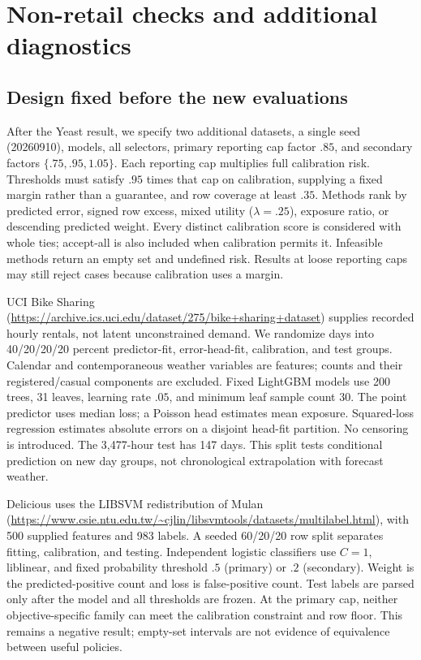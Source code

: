\section{Non-retail checks and additional diagnostics}\label{app:nonretail}
\subsection{Design fixed before the new evaluations}
After the Yeast result, we specify two additional datasets, a single seed (20260910), models, all selectors, primary reporting cap factor $.85$, and secondary factors $\{.75,.95,1.05\}$. Each reporting cap multiplies full calibration risk. Thresholds must satisfy $.95$ times that cap on calibration, supplying a fixed margin rather than a guarantee, and row coverage at least $.35$. Methods rank by predicted error, signed row excess, mixed utility ($\lambda=.25$), exposure ratio, or descending predicted weight. Every distinct calibration score is considered with whole ties; accept-all is also included when calibration permits it. Infeasible methods return an empty set and undefined risk. Results at loose reporting caps may still reject cases because calibration uses a margin.

UCI Bike Sharing (\url{https://archive.ics.uci.edu/dataset/275/bike+sharing+dataset}) supplies recorded hourly rentals, not latent unconstrained demand. We randomize days into 40/20/20/20 percent predictor-fit, error-head-fit, calibration, and test groups. Calendar and contemporaneous weather variables are features; counts and their registered/casual components are excluded. Fixed LightGBM models use 200 trees, 31 leaves, learning rate $.05$, and minimum leaf sample count 30. The point predictor uses median loss; a Poisson head estimates mean exposure. Squared-loss regression estimates absolute errors on a disjoint head-fit partition. No censoring is introduced. The 3,477-hour test has 147 days. This split tests conditional prediction on new day groups, not chronological extrapolation with forecast weather.

Delicious uses the LIBSVM redistribution of Mulan (\url{https://www.csie.ntu.edu.tw/~cjlin/libsvmtools/datasets/multilabel.html}), with 500 supplied features and 983 labels. A seeded 60/20/20 row split separates fitting, calibration, and testing. Independent logistic classifiers use $C=1$, liblinear, and fixed probability threshold $.5$ (primary) or $.2$ (secondary). Weight is the predicted-positive count and loss is false-positive count. Test labels are parsed only after the model and all thresholds are frozen. At the primary cap, neither objective-specific family can meet the calibration constraint and row floor. This remains a negative result; empty-set intervals are not evidence of equivalence between useful policies.

